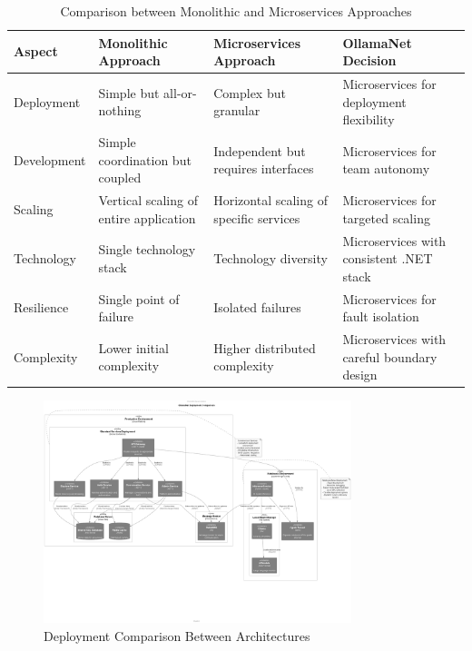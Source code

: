 \begin{table}[h]
  \centering
  \caption{Comparison between Monolithic and Microservices Approaches}
  \label{tab:mono-vs-micro}
  \begin{tabular}{|l|p{3.5cm}|p{3.5cm}|p{3.5cm}|}
    \hline
    \textbf{Aspect} & \textbf{Monolithic Approach} & \textbf{Microservices Approach} & \textbf{OllamaNet Decision} \\
    \hline
    Deployment & Simple but all-or-nothing & Complex but granular & Microservices for deployment flexibility \\
    \hline
    Development & Simple coordination but coupled & Independent but requires interfaces & Microservices for team autonomy \\
    \hline
    Scaling & Vertical scaling of entire application & Horizontal scaling of specific services & Microservices for targeted scaling \\
    \hline
    Technology & Single technology stack & Technology diversity & Microservices with consistent .NET stack \\
    \hline
    Resilience & Single point of failure & Isolated failures & Microservices for fault isolation \\
    \hline
    Complexity & Lower initial complexity & Higher distributed complexity & Microservices with careful boundary design \\
    \hline
  \end{tabular}
\end{table}

\begin{figure}
    \centering
    \includegraphics[width=0.8\textwidth]{./Chapter02/figures/Deployment_Comparison.png}
    \caption{Deployment Comparison Between Architectures}
    \label{fig:deploy-comparison}
\end{figure}

